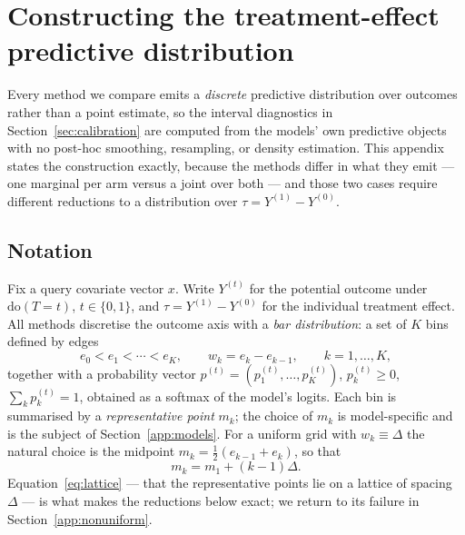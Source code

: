 \section{Constructing the treatment-effect predictive distribution}
\label{app:density}

Every method we compare emits a \emph{discrete} predictive distribution over
outcomes rather than a point estimate, so the interval diagnostics in
Section~\ref{sec:calibration} are computed from the models' own predictive
objects with no post-hoc smoothing, resampling, or density estimation. This
appendix states the construction exactly, because the methods differ in what
they emit --- one marginal per arm versus a joint over both --- and those two
cases require different reductions to a distribution over
$\tau = Y^{(1)} - Y^{(0)}$.

\subsection{Notation}
\label{app:notation}

Fix a query covariate vector $x$. Write $Y^{(t)}$ for the potential outcome
under $\mathrm{do}(T=t)$, $t \in \{0,1\}$, and $\tau = Y^{(1)} - Y^{(0)}$ for
the individual treatment effect. All methods discretise the outcome axis with
a \emph{bar distribution}: a set of $K$ bins defined by edges
\begin{equation}
  e_0 < e_1 < \cdots < e_K ,
  \qquad
  w_k = e_k - e_{k-1},
  \qquad k = 1,\dots,K ,
\end{equation}
together with a probability vector $p^{(t)} = (p^{(t)}_1,\dots,p^{(t)}_K)$,
$p^{(t)}_k \ge 0$, $\sum_k p^{(t)}_k = 1$, obtained as a softmax of the
model's logits. Each bin is summarised by a \emph{representative point}
$m_k$; the choice of $m_k$ is model-specific and is the subject of
Section~\ref{app:models}. For a uniform grid with $w_k \equiv \Delta$ the
natural choice is the midpoint $m_k = \tfrac12(e_{k-1} + e_k)$, so that
\begin{equation}
  m_k = m_1 + (k-1)\Delta .
  \label{eq:lattice}
\end{equation}
Equation~\eqref{eq:lattice} --- that the representative points lie on a
lattice of spacing $\Delta$ --- is what makes the reductions below exact; we
return to its failure in Section~\ref{app:nonuniform}.

